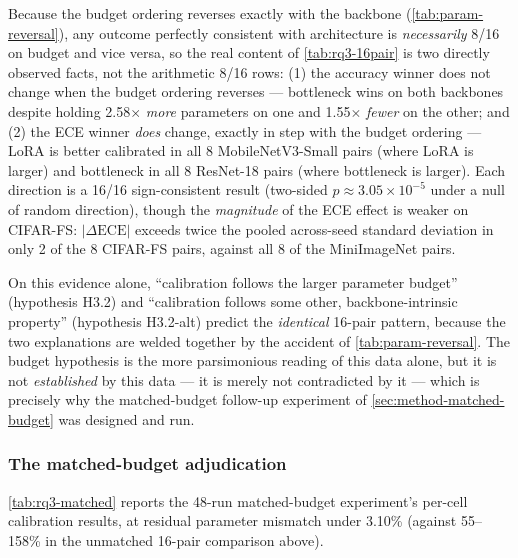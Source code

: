 \documentclass{iutbscthesis}
\begin{document}
Because the budget ordering reverses exactly with the backbone (\autoref{tab:param-reversal}), any outcome perfectly consistent with architecture is \emph{necessarily} 8/16 on budget and vice versa, so the real content of \autoref{tab:rq3-16pair} is two directly observed facts, not the arithmetic 8/16 rows: (1) the accuracy winner does not change when the budget ordering reverses — bottleneck wins on both backbones despite holding 2.58$\times$ \emph{more} parameters on one and 1.55$\times$ \emph{fewer} on the other; and (2) the ECE winner \emph{does} change, exactly in step with the budget ordering — LoRA is better calibrated in all 8 MobileNetV3-Small pairs (where LoRA is larger) and bottleneck in all 8 ResNet-18 pairs (where bottleneck is larger). Each direction is a 16/16 sign-consistent result (two-sided $p \approx 3.05 \times 10^{-5}$ under a null of random direction), though the \emph{magnitude} of the ECE effect is weaker on CIFAR-FS: $|\Delta\mathrm{ECE}|$ exceeds twice the pooled across-seed standard deviation in only 2 of the 8 CIFAR-FS pairs, against all 8 of the MiniImageNet pairs.

On this evidence alone, ``calibration follows the larger parameter budget'' (hypothesis H3.2) and ``calibration follows some other, backbone-intrinsic property'' (hypothesis H3.2-alt) predict the \emph{identical} 16-pair pattern, because the two explanations are welded together by the accident of \autoref{tab:param-reversal}. The budget hypothesis is the more parsimonious reading of this data alone, but it is not \emph{established} by this data — it is merely not contradicted by it — which is precisely why the matched-budget follow-up experiment of \autoref{sec:method-matched-budget} was designed and run.

\subsubsection{The matched-budget adjudication}
\label{sec:results-matched-budget}

\autoref{tab:rq3-matched} reports the 48-run matched-budget experiment's per-cell calibration results, at residual parameter mismatch under 3.10\% (against 55--158\% in the unmatched 16-pair comparison above).
\end{document}
